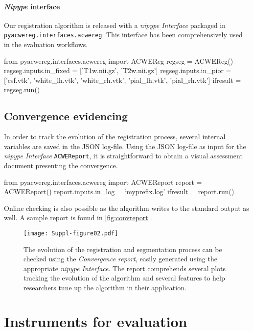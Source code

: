 \documentclass[a4paper]{report}
\newcommand*{\codeinline}[1]{\colorbox{listingbg}{\lstinline!#1!}}
\begin{document}
\paragraph{\emph{Nipype} interface}
Our registration algorithm is released with a \emph{nipype Interface} packaged in
  \codeinline{pyacwereg.interfaces.acwereg}.
This interface has been comprehensively used in the evaluation workflows.

\begin{pythoncode}
from pyacwereg.interfaces.acwereg import ACWEReg
regseg = ACWEReg()
regseg.inputs.in_fixed = ['T1w.nii.gz', 'T2w.nii.gz']
regseg.inputs.in_pior = ['csf.vtk', 'white_lh.vtk', 'white_rh.vtk',
                         'pial_lh.vtk', 'pial_rh.vtk']
ifresult = regseg.run()
\end{pythoncode}


\subsection{Convergence evidencing}\label{sec:convergence_evidence}

In order to track the evolution of the registration process, several internal variables
  are saved in the JSON log-file.
Using the JSON log-file as input for the \emph{nipype Interface}
  \codeinline{ACWEReport}, it is straightforward to obtain
  a visual assessment document presenting the convergence.
\begin{pythoncode}
from pyacwereg.interfaces.acwereg import ACWEReport
report = ACWEReport()
report.inputs.in_log = `myprefix.log'
ifresult = report.run()
\end{pythoncode}

Online checking is also possible as the algorithm writes to the standard output as well.
A sample report is found in \autoref{fig:convreport}.

\begin{figure*}[b]
  \texttt{[image: Suppl-figure02.pdf]}
  \caption{The evolution of the registration and segmentation process can be
    checked using the \emph{Convergence report},
    easily generated using the appropriate \emph{nipype Interface}.
  The report comprehends several plots tracking the evolution of the algorithm and several
    features to help researchers tune up the algorithm in their application.}%
    \label{fig:convreport}
\end{figure*}

\newpage
\section{Instruments for evaluation}
\end{document}
